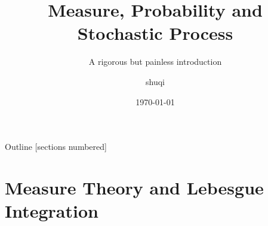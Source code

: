 \documentclass[utf-8, 10pt, aspectratio=1610]{beamer}
\title{Measure, Probability and Stochastic Process}
\subtitle{A rigorous but painless introduction}
\author{shuqi}
\date{\today}
\institute{
    \faGithub\;
    \href{https://github.com/xiaosq2000}{xiaosq2000}
    \quad
    \faEnvelope\;
    \href{xiaosq2000@gmail.com}{xiaosq2000@gmail.com}
}
\begin{document}
\begin{frame}
	\titlepage
\end{frame}


\begin{frame}[allowframebreaks]{Outline}
	[sections numbered]
	\tableofcontents[sections={1}]
	\framebreak
	\tableofcontents[sections={2-3}]
\end{frame}

\section{Measure Theory and Lebesgue Integration}
\end{document}
